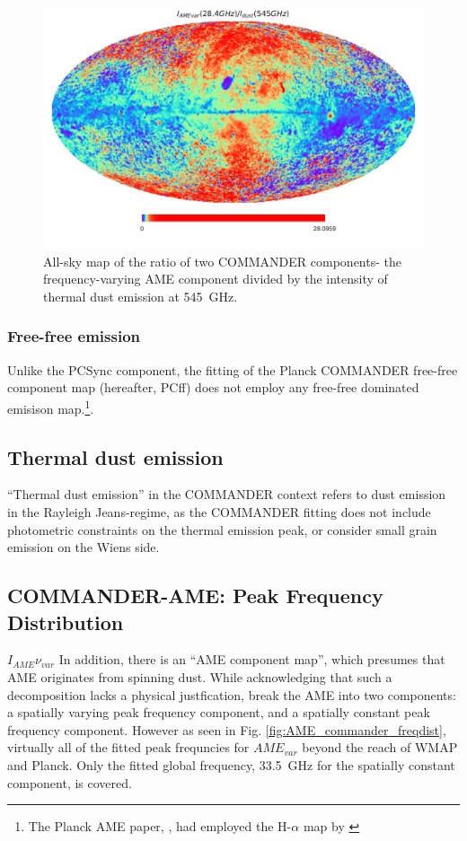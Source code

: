         \begin{figure}
            \centering
            \includegraphics[width=\textwidth]{../Plots/ch_datasources/R_PCAMEtoPCRad.pdf}
            \caption{All-sky map of the ratio of two COMMANDER components- the frequency-varying AME component divided by the intensity of thermal dust emission at 545~GHz. }
            \label{fig:R_PCAMEtoPCdust}
        \end{figure}

       \subsubsection{Free-free emission}
        Unlike the PCSync component, the fitting of the Planck COMMANDER free-free component map (hereafter, PCff) does not employ any free-free dominated emisison map.\footnote{The Planck AME paper, \cite{planckXV}, had employed the H-$\alpha$ map by \cite{wham98}}.

      \subsection{Thermal dust emission}
      ``Thermal dust emission'' in the COMMANDER context refers to dust emission in the Rayleigh Jeans-regime, as the COMMANDER fitting does not include photometric constraints on the thermal emission peak, or consider small grain emission on the Wiens side.

       \subsection{COMMANDER-AME: Peak Frequency Distribution}
        $I_{AME}\nu_{var}$
        In addition, there is an ``AME component map'', which presumes that AME originates from spinning dust. While acknowledging that such a decomposition lacks a physical justfication, \cite{planck15X} break the AME into two components: a spatially varying peak frequency component, and a spatially constant peak frequency component. However as seen in Fig. \ref{fig:AME_commander_freqdist}, virtually all of the fitted peak frequncies for $AME_{var}$ beyond the reach of WMAP and Planck. Only the fitted global frequency, 33.5~GHz for the spatially constant component, is covered.



